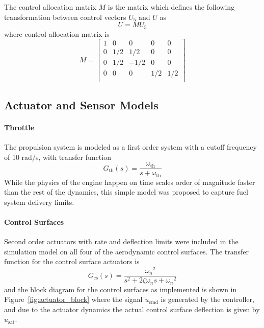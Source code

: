 The control allocation matrix $M$ is the matrix which defines the following transformation between control vectors $U_{5}$ and $U$ as
\begin{equation}
  U=MU_{5}
\end{equation}
where control allocation matrix is
\begin{equation}
  M=
  \left[
  \begin{array}{ccccc}
    1 & 0 & 0 & 0 & 0 \\
    0 & 1/2 & 1/2 & 0 & 0 \\
    0 & 1/2 & -1/2 & 0 & 0 \\
    0 & 0 & 0 & 1/2 & 1/2 \\
  \end{array}\right]
\end{equation}

\subsection{Actuator and Sensor Models}

\paragraph{Throttle} The propulsion system is modeled as a first order system with a cutoff frequency of 10 rad/s, with transfer function
\begin{equation*}
  G_{\text{th}}(s)=\frac{\omega_{\text{th}}}{s+{\omega_{\text{th}}}}
\end{equation*}
While the physics of the engine happen on time scales order of magnitude faster than the rest of the dynamics, this simple model was proposed to capture fuel system delivery limits.

\paragraph{Control Surfaces} Second order actuators with rate and deflection limits were included in the simulation model on all four of the aerodynamic control surfaces.
The transfer function for the control surface actuators is
\begin{equation}
  G_{\text{cs}}(s)=\frac{{\omega_{n}}^{2}}{s^{2}+2\zeta\omega_{n}s+{\omega_{n}}^{2}}
\end{equation}
and the block diagram for the control surfaces as implemented is shown in Figure~\ref{fig:actuator_block} where the signal $u_{\text{cmd}}$ is generated by the controller, and due to the actuator dynamics the actual control surface deflection is given by $u_{\text{sat}}$.

